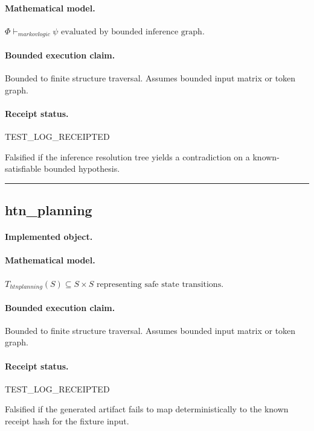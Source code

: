 \paragraph{Mathematical model.} $\Phi \vdash_{markovlogic} \psi \text{ evaluated by bounded inference graph}.$
\paragraph{Bounded execution claim.} Bounded to finite structure traversal. Assumes bounded input matrix or token graph.
\paragraph{Receipt status.} TEST\_LOG\_RECEIPTED
\begin{falsifier}
Falsified if the inference resolution tree yields a contradiction on a known-satisfiable bounded hypothesis.
\end{falsifier}

\vspace{1em}\hrule\vspace{1em}
\subsection{htn\_planning}
\paragraph{Implemented object.} 
\paragraph{Mathematical model.} $T_{htnplanning}(S) \subseteq S \times S \text{ representing safe state transitions}.$
\paragraph{Bounded execution claim.} Bounded to finite structure traversal. Assumes bounded input matrix or token graph.
\paragraph{Receipt status.} TEST\_LOG\_RECEIPTED
\begin{falsifier}
Falsified if the generated artifact fails to map deterministically to the known receipt hash for the fixture input.
\end{falsifier}

